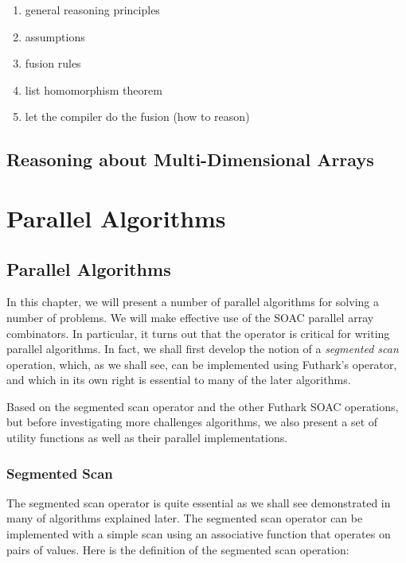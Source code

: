 \documentclass[oneside,11pt]{book}
\begin{document}
\begin{enumerate}
\item general reasoning principles
\item assumptions
\item fusion rules
\item list homomorphism theorem
\item let the compiler do the fusion (how to reason)
\end{enumerate}

\chapter{Reasoning about Multi-Dimensional Arrays}

\part{Parallel Algorithms}

\chapter{Parallel Algorithms}
\label{chap:parallel-algorithms}

In this chapter, we will present a number of parallel algorithms for
solving a number of problems. We will make effective use of the
SOAC parallel array combinators. In particular, it turns out that the
 operator is critical for writing parallel algorithms. In
fact, we shall first develop the notion of a \emph{segmented scan}
operation, which, as we shall see, can be implemented using Futhark's 
operator, and which in its own right is essential to many of the later
algorithms.

Based on the segmented scan operator and the other Futhark SOAC
operations, but before investigating more challenges algorithms, we
also present a set of utility functions as well as their parallel
implementations.

\section{Segmented Scan}
\label{sec:sgmscan}

The segmented scan operator is quite essential as we shall see
demonstrated in many of algorithms explained later. The segmented scan
operator can be implemented with a simple scan using an associative
function that operates on pairs of values. Here is the definition of
the segmented scan operation:
\end{document}
